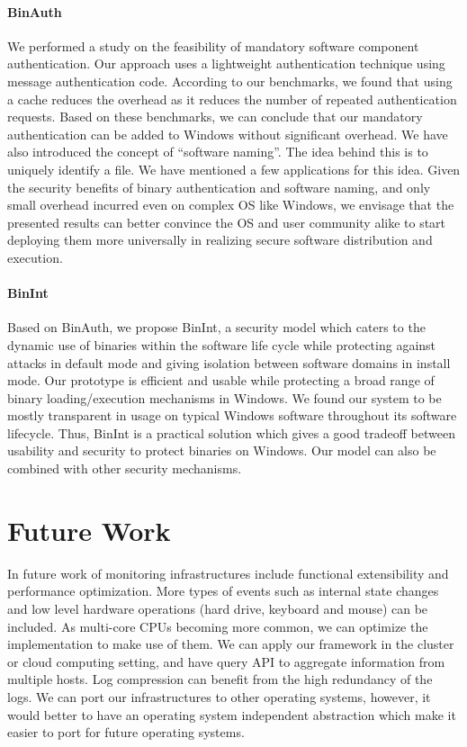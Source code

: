 \paragraph{BinAuth}
We performed a study on the feasibility of mandatory
software component authentication. Our approach uses a lightweight
authentication technique using message authentication code.
According to our benchmarks, we
found that using a cache reduces the overhead as it reduces
the number of repeated authentication requests.
Based on these benchmarks,
we can conclude that our mandatory authentication can be added to Windows
without significant overhead.
We have also introduced the concept of ``software naming''. The
idea behind this is to uniquely identify a file. We have mentioned a few
applications for this idea.
Given the security benefits of binary authentication and software naming,
and only small overhead incurred even on complex OS like Windows,
we envisage that the presented results can better convince
the OS and user community alike to start deploying them more universally
in realizing secure software distribution and execution.

\paragraph{BinInt}
Based on BinAuth, we propose BinInt, a security model which caters to the
dynamic use of binaries within the software life cycle
while protecting against attacks in default mode
and giving isolation between software domains in install mode.
Our prototype is efficient and usable while
protecting a broad range of binary loading/execution mechanisms in Windows.
We found our system to be mostly transparent in usage on typical
Windows software throughout its software lifecycle.
Thus, BinInt is a practical solution
which gives a good tradeoff between usability and security
to protect binaries on Windows.
Our model can also be combined with other security mechanisms.

\section{Future Work}
\label{sec:future}

In future work of monitoring infrastructures include functional
extensibility and performance optimization.
More types of events such as internal state changes and low level
hardware operations (hard drive, keyboard and mouse) can be included.
As multi-core CPUs becoming more common, we can optimize the
implementation to make use of them.
We can apply our framework in the cluster or cloud computing setting,
and have query API to aggregate information from multiple hosts.
Log compression can benefit from the high redundancy of the logs.
We can port our infrastructures to other operating systems,
however, it would better to have an operating system independent
abstraction which make it easier to port for future operating systems.
